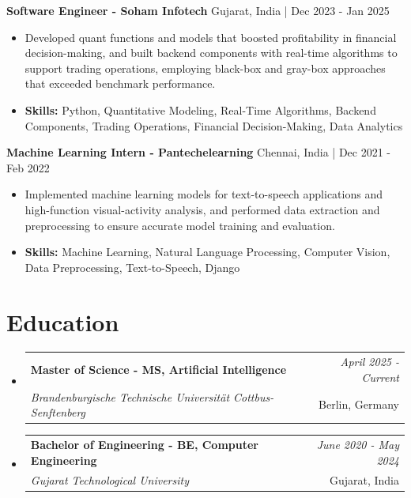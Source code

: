 \documentclass[a4paper,11pt]{article}
\makeatletter
\newcommand{\resumeSubheading}[4]{
\vspace{0.5mm}\item
    \begin{tabular*}{\linewidth}[t]{l@{\extracolsep{\fill}}r}
        \textbf{#1} & \textit{\footnotesize{#4}} \\
        \textit{\footnotesize{#3}} &  \footnotesize{#2}\\
    \end{tabular*}
    \vspace{-2.4mm}
}
\makeatother
\begin{document}
\vspace{1mm}
  \textbf{Software Engineer - Soham Infotech} \hfill Gujarat, India | Dec 2023 - Jan 2025
\vspace{-1.5mm} %
\begin{itemize}
  \item Developed quant functions and models that boosted profitability in financial decision-making, and built backend components with real-time algorithms to support trading operations, employing black-box and gray-box approaches that exceeded benchmark performance.

\vspace{-2mm}
  \item \textbf{Skills:} Python, Quantitative Modeling, Real-Time Algorithms, Backend Components, Trading Operations, Financial Decision-Making, Data Analytics
\end{itemize}

\vspace{1mm}
  \textbf{Machine Learning Intern - Pantechelearning} \hfill Chennai, India | Dec 2021 - Feb 2022
\vspace{-1.5mm} %
\begin{itemize}
  \item Implemented machine learning models for text-to-speech applications and high-function visual-activity analysis, and performed data extraction and preprocessing to ensure accurate model training and evaluation.
\vspace{-2mm}
  \item \textbf{Skills:} Machine Learning, Natural Language Processing, Computer Vision, Data Preprocessing, Text-to-Speech, Django
\end{itemize}\section{\textbf{Education}}
\vspace{-0.4mm}

\begin{itemize}[leftmargin=0.15in, label={}]
\resumeSubheading
{Master of Science - MS, Artificial Intelligence }{Berlin, Germany}
{Brandenburgische Technische Universität Cottbus-Senftenberg  }{April 2025 - Current}

\vspace{1.0mm} %
\resumeSubheading
{Bachelor of Engineering - BE, Computer Engineering  }{Gujarat, India}
{Gujarat Technological University }{June 2020 - May 2024}

\end{itemize}
\end{document}
